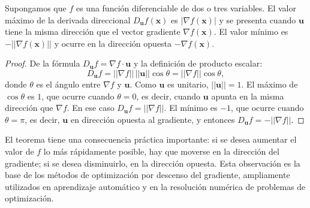 \begin{theorem}
Supongamos que $f$ es una función diferenciable de dos o tres variables.
El valor máximo de la derivada direccional $D_{\mathbf{u}} f(\mathbf{x})$
es $|\nabla f(\mathbf{x})|$ y se presenta cuando $\mathbf{u}$ tiene la
misma dirección que el vector gradiente $\nabla f(\mathbf{x})$. El valor
mínimo es $-||\nabla f(\mathbf{x})||$ y ocurre en la dirección opuesta
$-\nabla f(\mathbf{x})$.
\end{theorem}

\begin{proof}
De la fórmula $D_{\mathbf{u}} f = \nabla f \cdot \mathbf{u}$ y la
definición de producto escalar:
\[
D_{\mathbf{u}} f = ||\nabla f||\,||\mathbf{u}||\cos\theta
= ||\nabla f||\cos\theta,
\]
donde $\theta$ es el ángulo entre $\nabla f$ y $\mathbf{u}$. Como
$\mathbf{u}$ es unitario, $||\mathbf{u}||=1$. El máximo de $\cos\theta$ es
$1$, que ocurre cuando $\theta=0$, es decir, cuando $\mathbf{u}$ apunta
en la misma dirección que $\nabla f$. En ese caso
$D_{\mathbf{u}} f = ||\nabla f||$. El mínimo es $-1$, que ocurre cuando
$\theta=\pi$, es decir, $\mathbf{u}$ en dirección opuesta al gradiente,
y entonces $D_{\mathbf{u}} f = -||\nabla f||$.
\end{proof}

\begin{rem}
El teorema tiene una consecuencia práctica importante: si se desea
aumentar el valor de $f$ lo más rápidamente posible, hay que moverse en
la dirección del gradiente; si se desea disminuirlo, en la dirección
opuesta. Esta observación es la base de los métodos de optimización por
descenso del gradiente, ampliamente utilizados en aprendizaje automático
y en la resolución numérica de problemas de optimización.
\end{rem}

